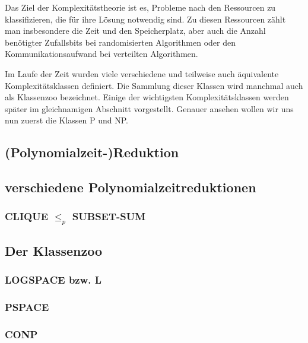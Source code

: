 Das Ziel der Komplexitätstheorie ist es, Probleme nach den Ressourcen zu
klassifizieren, die für ihre Lösung notwendig sind.
Zu diesen Ressourcen zählt man insbesondere die Zeit und den Speicherplatz, aber
auch die Anzahl benötigter Zufallsbits bei randomisierten Algorithmen oder den
Kommunikationsaufwand bei verteilten Algorithmen.

Im Laufe der Zeit wurden viele verschiedene und teilweise auch äquivalente
Komplexitätsklassen definiert. Die Sammlung dieser Klassen wird manchmal auch
als Klassenzoo bezeichnet. Einige der wichtigsten Komplexitätsklassen werden
später im gleichnamigen Abschnitt vorgestellt. Genauer ansehen wollen wir uns
nun zuerst die Klassen P und NP.

\subsection{(Polynomialzeit-)Reduktion}
\subsection{verschiedene Polynomialzeitreduktionen}
\subsubsection{CLIQUE $\leq_p$ SUBSET-SUM}

\subsection{Der Klassenzoo}

\subsubsection{LOGSPACE bzw. L}
\subsubsection{PSPACE}
\subsubsection{CONP}